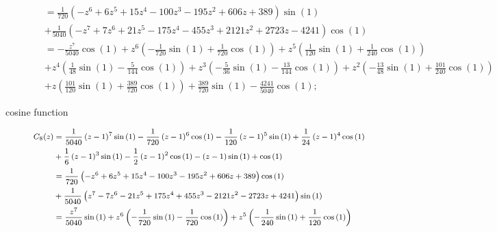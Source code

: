 \begin{description}
\begin{displaymath}
\begin{split}
                             &= \frac{1}{720} \left(- z^{6} + 6 z^{5} + 15 z^{4} - 100 z^{3} - 195 z^{2} + 606 z + 389\right) \sin{\left (1 \right )} \\
                             &+ \frac{1}{5040} \left(- z^{7} + 7 z^{6} + 21 z^{5} - 175 z^{4} - 455 z^{3} + 2121 z^{2} + 2723 z - 4241\right) \cos{\left (1 \right )} \\
                             &= - \frac{z^{7}}{5040} \cos{\left (1 \right )} + z^{6} \left(- \frac{1}{720} \sin{\left (1 \right )} + \frac{1}{720} \cos{\left (1 \right )}\right) + z^{5} \left(\frac{1}{120} \sin{\left (1 \right )} + \frac{1}{240} \cos{\left (1 \right )}\right) \\
                             &+ z^{4} \left(\frac{1}{48} \sin{\left (1 \right )} - \frac{5}{144} \cos{\left (1 \right )}\right) + z^{3} \left(- \frac{5}{36} \sin{\left (1 \right )} - \frac{13}{144} \cos{\left (1 \right )}\right) + z^{2} \left(- \frac{13}{48} \sin{\left (1 \right )} + \frac{101}{240} \cos{\left (1 \right )}\right) \\
                             &+ z \left(\frac{101}{120} \sin{\left (1 \right )} + \frac{389}{720} \cos{\left (1 \right )}\right) + \frac{389}{720} \sin{\left (1 \right )} - \frac{4241}{5040} \cos{\left (1 \right )};
    \end{split}
\end{displaymath}
\item[cosine function]
\begin{displaymath}
    \footnotesize
    \begin{split}
        C_{8}{\left (z \right )} &= \frac{1}{5040} \left(z - 1\right)^{7} \sin{\left (1 \right )} - \frac{1}{720} \left(z - 1\right)^{6} \cos{\left (1 \right )} - \frac{1}{120} \left(z - 1\right)^{5} \sin{\left (1 \right )} + \frac{1}{24} \left(z - 1\right)^{4} \cos{\left (1 \right )} \\ &+ \frac{1}{6} \left(z - 1\right)^{3} \sin{\left (1 \right )} - \frac{1}{2} \left(z - 1\right)^{2} \cos{\left (1 \right )} - \left(z - 1\right) \sin{\left (1 \right )} + \cos{\left (1 \right )} \\
                             &= \frac{1}{720} \left(- z^{6} + 6 z^{5} + 15 z^{4} - 100 z^{3} - 195 z^{2} + 606 z + 389\right) \cos{\left (1 \right )} \\
                             &+ \frac{1}{5040} \left(z^{7} - 7 z^{6} - 21 z^{5} + 175 z^{4} + 455 z^{3} - 2121 z^{2} - 2723 z + 4241\right) \sin{\left (1 \right )}\\
                             &= \frac{z^{7}}{5040} \sin{\left (1 \right )} + z^{6} \left(- \frac{1}{720} \sin{\left (1 \right )} - \frac{1}{720} \cos{\left (1 \right )}\right) + z^{5} \left(- \frac{1}{240} \sin{\left (1 \right )} + \frac{1}{120} \cos{\left (1 \right )}\right) \\

\end{split}
\end{displaymath}
\end{description}

